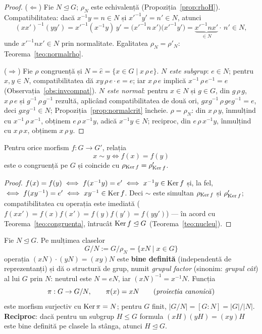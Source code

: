 \begin{proof}
($\Leftarrow$) Fie $N\trianglelefteq G$; $\rho_N$ este echivalență (Propoziția~\ref{prop:rhoH}). Compatibilitatea: dacă $x^{-1}y=n\in N$ și $x'^{-1}y'=n'\in N$, atunci
\[
(xx')^{-1}(yy')=x'^{-1}(x^{-1}y)\,y'=\bigl(x'^{-1}n\,x'\bigr)\bigl(x'^{-1}y'\bigr)=\underbrace{x'^{-1}nx'}_{\in N}\cdot\,n'\in N,
\]
unde $x'^{-1}nx'\in N$ prin normalitate. Egalitatea $\rho_N=\rho'_N$: Teorema~\ref{teo:normalrho}.

($\Rightarrow$) Fie $\rho$ congruență și $N=\widehat e=\{x\in G\mid x\,\rho\,e\}$. \emph{$N$ este subgrup}: $e\in N$; pentru $x,y\in N$, compatibilitatea dă $xy\,\rho\,e\cdot e=e$; iar $x\,\rho\,e$ implică $x^{-1}\,\rho\,e^{-1}=e$ (Observația~\ref{obs:invcompat}). \emph{$N$ este normal}: pentru $x\in N$ și $g\in G$, din $g\,\rho\,g$, $x\,\rho\,e$ și $g^{-1}\,\rho\,g^{-1}$ rezultă, aplicând compatibilitatea de două ori, $gxg^{-1}\,\rho\,geg^{-1}=e$, deci $gxg^{-1}\in N$; Propoziția~\ref{prop:normalcrit} încheie. \emph{$\rho=\rho_N$}: din $x\,\rho\,y$, înmulțind cu $x^{-1}\,\rho\,x^{-1}$, obținem $e\,\rho\,x^{-1}y$, adică $x^{-1}y\in N$; reciproc, din $e\,\rho\,x^{-1}y$, înmulțind cu $x\,\rho\,x$, obținem $x\,\rho\,y$.
\end{proof}

\begin{propozitie}\label{prop:congmorf}
Pentru orice morfism $f:G\to G'$, relația
\[
x\sim y\iff f(x)=f(y)
\]
este o congruență pe $G$ și coincide cu $\rho_{\operatorname{Ker} f}=\rho'_{\operatorname{Ker} f}$.
\end{propozitie}

\begin{proof}
$f(x)=f(y)\iff f(x^{-1}y)=e'\iff x^{-1}y\in\operatorname{Ker} f$ și, la fel, $\iff f(xy^{-1})=e'\iff xy^{-1}\in\operatorname{Ker} f$. Deci $\sim$ este simultan $\rho_{\operatorname{Ker} f}$ și $\rho'_{\operatorname{Ker} f}$; compatibilitatea cu operația este imediată ($f(xx')=f(x)f(x')=f(y)f(y')=f(yy')$) --- în acord cu Teorema~\ref{teo:congruenta}, întrucât $\operatorname{Ker} f\trianglelefteq G$ (Teorema~\ref{teo:nucleu}).
\end{proof}

\begin{teorema}\label{teo:factor}
Fie $N\trianglelefteq G$. Pe mulțimea claselor
\[
G/N:=G/\rho_N=\{xN\mid x\in G\}
\]
operația $(xN)\cdot(yN)=(xy)N$ este \textbf{bine definită} (independentă de reprezentanți) și dă o structură de grup, numit \emph{grupul factor} (sinonim: \emph{grupul cât}) al lui $G$ prin $N$: neutrul este $N=eN$, iar $(xN)^{-1}=x^{-1}N$. Funcția
\[
\pi:G\to G/N,\qquad\pi(x)=xN\qquad(\text{\emph{proiecția canonică}})
\]
este morfism surjectiv cu $\operatorname{Ker}\pi=N$; pentru $G$ finit, $|G/N|=[G:N]=|G|/|N|$.
\textbf{Reciproc}: dacă pentru un subgrup $H\le G$ formula $(xH)(yH)=(xy)H$ este bine definită pe clasele la stânga, atunci $H\trianglelefteq G$.
\end{teorema}


